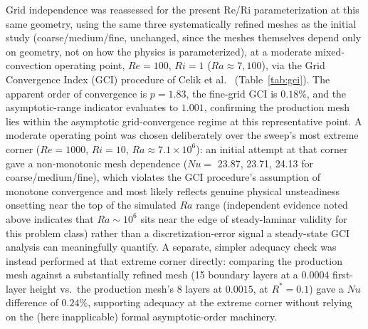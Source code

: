 Grid independence was reassessed for the present Re/Ri parameterization at this same geometry, using the same three systematically refined meshes as the initial study (coarse/medium/fine, unchanged, since the meshes themselves depend only on geometry, not on how the physics is parameterized), at a moderate mixed-convection operating point, $Re=100$, $Ri=1$ ($Ra\approx7{,}100$), via the Grid Convergence Index (GCI) procedure of Celik et al.~\cite{Celik2008} (Table~\ref{tab:gci}). The apparent order of convergence is $p=1.83$, the fine-grid GCI is $0.18\%$, and the asymptotic-range indicator evaluates to $1.001$, confirming the production mesh lies within the asymptotic grid-convergence regime at this representative point. A moderate operating point was chosen deliberately over the sweep's most extreme corner ($Re=1000$, $Ri=10$, $Ra\approx7.1\times10^6$): an initial attempt at that corner gave a non-monotonic mesh dependence ($Nu=$ 23.87, 23.71, 24.13 for coarse/medium/fine), which violates the GCI procedure's assumption of monotone convergence and most likely reflects genuine physical unsteadiness onsetting near the top of the simulated $Ra$ range (independent evidence noted above indicates that $Ra\sim10^6$ sits near the edge of steady-laminar validity for this problem class) rather than a discretization-error signal a steady-state GCI analysis can meaningfully quantify. A separate, simpler adequacy check was instead performed at that extreme corner directly: comparing the production mesh against a substantially refined mesh (15 boundary layers at a $0.0004$ first-layer height vs.\ the production mesh's 8 layers at $0.0015$, at $R^\ast=0.1$) gave a $Nu$ difference of $0.24\%$, supporting adequacy at the extreme corner without relying on the (here inapplicable) formal asymptotic-order machinery.

